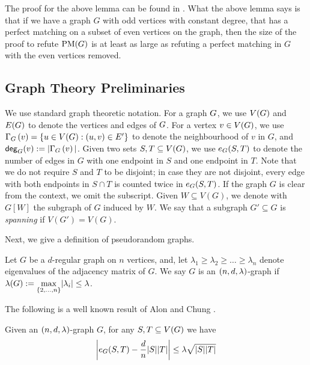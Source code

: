 \documentclass[11pt]{article}
\begin{document}
The proof for the above lemma can be found in \citep[Lemma 2.2]{Austrin_2022}.
What the above lemma says is that if we have a graph $G$ with odd vertices with constant degree, that has a perfect matching on a subset of even vertices on the graph, then the size of the proof to refute $\PM{G}$ is at least as large as refuting a perfect matching in $G$ with the even vertices removed.


\subsection{Graph Theory Preliminaries}
\label{sec:graph-theory-prelims}

We use standard graph theoretic notation. For a graph $\Graph$, we use $\Vertices{\Graph}$ and $\Edges{\Graph}$ to denote the vertices and edges of $\Graph$. For a vertex $v \in \Vertices{\Graph}$, we use $\Neighbourhood{G}{v} = \{ u \in \Vertices{\Graph} : (u,v) \in E' \}$ to denote the neighbourhood of $v$ in $G$, and $\degree{G}{v} := |\Neighbourhood{G}{v}|$. Given two sets $S, T \subseteq \Vertices{G}$, we  use $\CutEdges{S}{T}{G}$ to denote the number of edges in $G$ with one endpoint in $S$ and one endpoint in $T$.  Note that we do not require $S$ and $T$ to be disjoint; in case they are not disjoint, every edge with both endpoints in $S \cap T$ is counted twice in $\CutEdges{S}{T}{G}$. If the graph $G$ is clear from the context, we omit the subscript. Given $W \subseteq V(G)$, we denote with $G[W]$ the subgraph of $G$ induced by $W$. We say that a subgraph $G' \subseteq G$ is \emph{spanning} if $V(G') = V(G)$.

Next, we give a definition of pseudorandom graphs.

\begin{definition}\label{def:expander-graphs}
Let $G$ be a $d$-regular graph on $n$ vertices, and, let $\lambda_1 \geq \lambda_2 \ge \dots \geq \lambda_n$ denote eigenvalues of the adjacency matrix of $G$.
We say $G$ is an $\EnDeeLambda$-graph if $\ExpansionFactor{\Graph} := \underset{{\{2, \dots, n\}}}{\max}|\lambda_i| \leq \lambda$.
\end{definition}

The following is a well known result of Alon and Chung \cite{alon88mixing}.

\begin{lemma}\label{lemma:expanders-mixing-lemma}
  Given an $\EnDeeLambda$-graph $G$, for any $S, T \subseteq \Vertices{G}$ we have
$$
  \left| \CutEdges{S}{T}{G} - \frac{d}{n}|S||T| \right|
  \le \lambda\sqrt{\Size{S}\Size{T} }
$$
\end{lemma}
\end{document}
